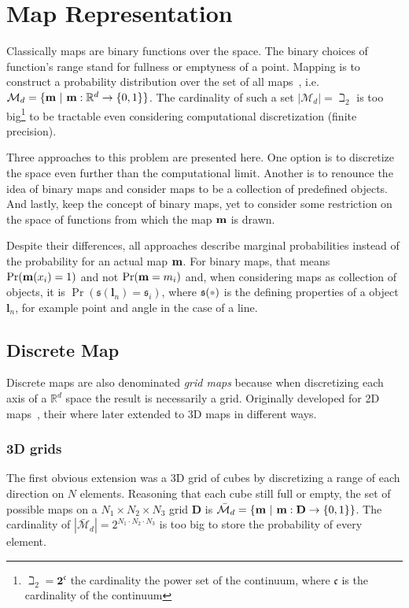 \section{Map Representation}
\label{s:map_rep}
Classically maps are binary functions over the space. The
binary choices of function's range stand for fullness or emptyness of a point.
Mapping is to construct a probability distribution over the set of all maps~\cite{thrunprob},
i.e.
$\mathcal{M}_d=\{\mathrm{\mathbf{m}}~|~\mathrm{\mathbf{m}}:\mathbb{R}^d\to\{0,1\}\}$. The
cardinality of such a set
$|\mathcal{M}_d|=\beth_2$ is too big\footnote{$\beth_2=\mathbf{2}^\mathfrak{c}$
the cardinality the power set of the continuum, where $\mathfrak{c}$ is the
cardinality of the continuum } to be tractable even considering computational discretization (finite precision).

Three approaches to this problem are presented here. One option is to discretize
the space even further than the computational limit. Another is to renounce
the idea of binary maps and consider maps to be a collection of predefined
objects. And lastly, keep the concept of binary maps, yet to consider some
restriction on the space of functions from which the map $\mathrm{\mathbf{m}}$ is drawn.

Despite their differences, all approaches describe marginal probabilities
instead of the probability for an actual map $\mathrm{\mathbf{m}}$. For binary maps,
that means $\Pr(\mathrm{\mathbf{m}}(x_i)=1)$ and not $\Pr(\mathrm{\mathbf{m}}=m_i)$ and, when
considering maps as collection of objects, it is
$\Pr(\mathfrak{s}(\mathbf{l}_n)=\mathfrak{s}_i)$, where $\mathfrak{s}(\parm)$ is
the defining properties of a object $\mathbf{l}_n$, for example point and angle
in the case of a line.

\subsection{Discrete Map}

Discrete maps are also denominated \textit{grid maps} because when discretizing
each axis of a $\mathbb{R}^d$ space the result is necessarily a grid. Originally
developed for 2D maps~\cite{thrunprob}, their where later extended to 3D maps
in different ways.

\subsubsection{3D grids}
\label{sss:3dgrid}
The first obvious extension was a 3D grid of cubes by discretizing a range
of each direction on $N$ elements. Reasoning that each cube still full
or empty, the set of possible maps on a $N_1\times N_2\times
N_3$ grid $\mathbf{D}$ is
$\bar{\mathcal{M}}_d=\{\mathrm{\mathbf{m}}~|~\mathrm{\mathbf{m}}:\mathbf{D}\to\{0,1\}\}$. The
cardinality of $|\bar{\mathcal{M}}_d|=2^{N_1\cdot N_2\cdot
N_3}$ is too big to store the probability of every element. 

